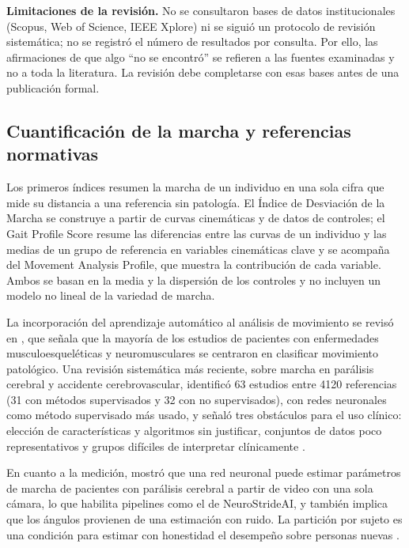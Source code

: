 \documentclass[11pt,a4paper]{article}
\begin{document}
\textbf{Limitaciones de la revisión.} No se consultaron bases de datos institucionales (Scopus, Web of Science, IEEE Xplore) ni se siguió un protocolo de revisión sistemática; no se registró el número de resultados por consulta. Por ello, las afirmaciones de que algo ``no se encontró'' se refieren a las fuentes examinadas y no a toda la literatura. La revisión debe completarse con esas bases antes de una publicación formal.

\subsection{Cuantificación de la marcha y referencias normativas}

Los primeros índices resumen la marcha de un individuo en una sola cifra que mide su distancia a una referencia sin patología. El Índice de Desviación de la Marcha \cite{schwartz2008} se construye a partir de curvas cinemáticas y de datos de controles; el Gait Profile Score \cite{baker2009} resume las diferencias entre las curvas de un individuo y las medias de un grupo de referencia en variables cinemáticas clave y se acompaña del Movement Analysis Profile, que muestra la contribución de cada variable. Ambos se basan en la media y la dispersión de los controles y no incluyen un modelo no lineal de la variedad de marcha.

La incorporación del aprendizaje automático al análisis de movimiento se revisó en \cite{halilaj2018}, que señala que la mayoría de los estudios de pacientes con enfermedades musculoesqueléticas y neuromusculares se centraron en clasificar movimiento patológico. Una revisión sistemática más reciente, sobre marcha en parálisis cerebral y accidente cerebrovascular, identificó 63 estudios entre 4120 referencias (31 con métodos supervisados y 32 con no supervisados), con redes neuronales como método supervisado más usado, y señaló tres obstáculos para el uso clínico: elección de características y algoritmos sin justificar, conjuntos de datos poco representativos y grupos difíciles de interpretar clínicamente \cite{samadi2024}.

En cuanto a la medición, \cite{kidzinski2020} mostró que una red neuronal puede estimar parámetros de marcha de pacientes con parálisis cerebral a partir de video con una sola cámara, lo que habilita pipelines como el de NeuroStrideAI, y también implica que los ángulos provienen de una estimación con ruido. La partición por sujeto es una condición para estimar con honestidad el desempeño sobre personas nuevas \cite{saeb2017}.
\end{document}

